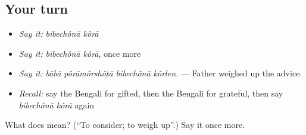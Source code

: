 \subsection*{Your turn}
\begin{itemize}
\raggedright
  \item \emph{Say it:} \emph{bibechônā kôrā}
  \item \emph{Say it:} \emph{bibechônā kôrā}, once more
  \item \emph{Say it:} \emph{bābā pôrāmôrshôṭā bibechônā kôrlen.} — Father weighed up the advice.
  \item \emph{Recall:} say the Bengali for gifted, then the Bengali for grateful, then say \emph{bibechônā kôrā} again
\end{itemize}

\begin{tcolorbox}[breakable,colback=teal!4,colframe=teal!35!black,title={Before you move on}]
What does   mean? (\textquotedblleft{}To consider; to weigh up\textquotedblright{}.) Say it once more.
\end{tcolorbox}
